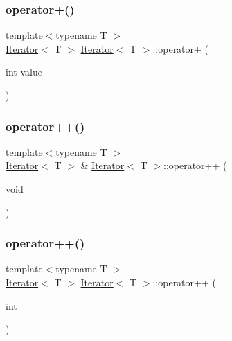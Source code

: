 \mbox{\label{classIterator_a2968564be6f00ffefcc3937219306faf}} 
\subsubsection{\texorpdfstring{operator+()}{operator+()}}
{\footnotesize\ttfamily template$<$typename T $>$ \\
\hyperlink{classIterator}{Iterator}$<$ T $>$ \hyperlink{classIterator}{Iterator}$<$ T $>$\+::operator+ (\begin{DoxyParamCaption}\item[{int}]{value }\end{DoxyParamCaption})}

\mbox{\label{classIterator_aeb34c80997916ed2561271a7ed56014f}} 
\subsubsection{\texorpdfstring{operator++()}{operator++()}\hspace{0.1cm}{\footnotesize\ttfamily [1/2]}}
{\footnotesize\ttfamily template$<$typename T $>$ \\
\hyperlink{classIterator}{Iterator}$<$ T $>$ \& \hyperlink{classIterator}{Iterator}$<$ T $>$\+::operator++ (\begin{DoxyParamCaption}\item[{void}]{ }\end{DoxyParamCaption})}

\mbox{\label{classIterator_ae6099903beb02cae7feaac22c6cc1965}} 
\subsubsection{\texorpdfstring{operator++()}{operator++()}\hspace{0.1cm}{\footnotesize\ttfamily [2/2]}}
{\footnotesize\ttfamily template$<$typename T $>$ \\
\hyperlink{classIterator}{Iterator}$<$ T $>$ \hyperlink{classIterator}{Iterator}$<$ T $>$\+::operator++ (\begin{DoxyParamCaption}\item[{int}]{ }\end{DoxyParamCaption})}

